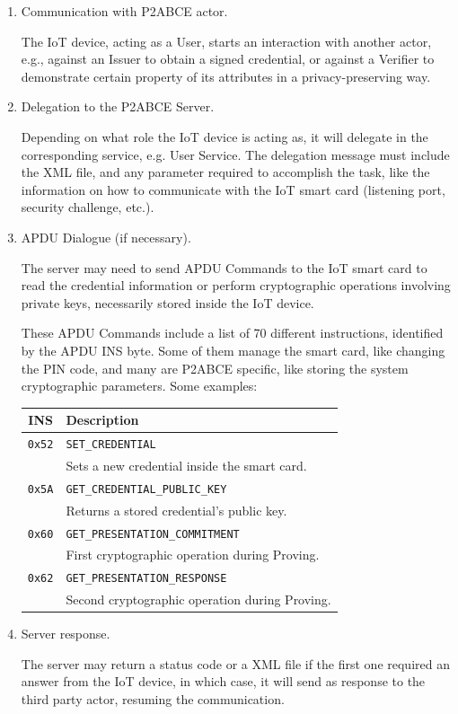 \documentclass[journal]{IEEEtran}
\begin{document}
\begin{enumerate}
	\item Communication with P2ABCE actor.
	
	The IoT device, acting as a User, starts an interaction with another actor, e.g., against an Issuer to obtain a signed credential, or against a Verifier to demonstrate certain property of its attributes in a privacy-preserving way.
	
	\item Delegation to the P2ABCE Server.
	
	Depending on what role the IoT device is acting as, it will delegate in the corresponding service, e.g. User Service. The delegation message must include the XML file, and any parameter required to accomplish the task, like the information on how to communicate with the IoT smart card (listening port, security challenge, etc.).
	
	\item APDU Dialogue (if necessary).
	
	The server may need to send APDU Commands to the IoT smart card to read the credential information or perform cryptographic operations involving private keys, necessarily stored inside the IoT device.
	
	These APDU Commands include a list of 70 different instructions, identified by the APDU INS byte. Some of them manage the smart card, like changing the PIN code, and many are P2ABCE specific, like storing the system cryptographic parameters. Some examples:
	
	\begin{tabular}{|c|l|}
		\hline
		INS & Description \\
		\hline
		\texttt{0x52} & \texttt{SET\_CREDENTIAL} \\ & Sets a new credential inside the smart card.\\
		\texttt{0x5A} & \texttt{GET\_CREDENTIAL\_PUBLIC\_KEY} \\ & Returns a stored credential's public key.\\
		\texttt{0x60} & \texttt{GET\_PRESENTATION\_COMMITMENT} \\ & First cryptographic operation during Proving.\\
		\texttt{0x62} & \texttt{GET\_PRESENTATION\_RESPONSE} \\ & Second cryptographic operation during Proving.\\
		\hline		
	\end{tabular}
	
	\hfil
	
	\item Server response.
	
	The server may return a status code or a XML file if the first one required an answer from the IoT device, in which case, it will send as response to the third party actor, resuming the communication.
	
\end{enumerate}
\end{document}
